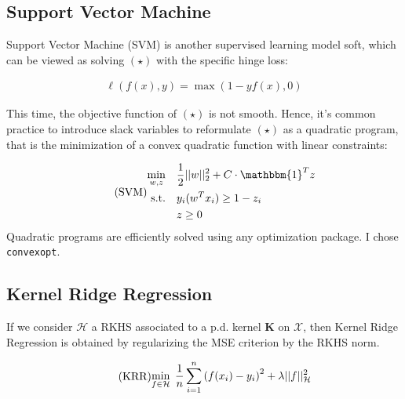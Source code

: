 \documentclass[final]{cvpr}
\begin{document}
	\subsection{Support Vector Machine} 
	
	Support Vector Machine (SVM) is another supervised learning model soft, which can be viewed as solving $(\star)$ with the specific hinge loss:
	
	\vspace{-2mm}
	
	\begin{equation*}
		\begin{aligned}
			\ell  \left( f(x), y \right) = \max \left(1-yf(x), 0 \right)
		\end{aligned}
	\end{equation*}
	
	\noindent
	This time, the objective function of $(\star)$ is not smooth. Hence, it's common practice to introduce slack variables to reformulate $(\star)$ as a quadratic program, that is the minimization of a convex quadratic function with linear constraints:
	
	\begin{equation*}\tag{\text{SVM}}
		\begin{aligned}
			\min_{w,z} \quad & \dfrac{1}{2} \vert\vert w \vert\vert_{2}^{2} + C \cdot \mathbbm{1}^T z \\
			\textrm{s.t.} \quad & y_i(w^Tx_i) \geq 1 - z_i \\
			& z \geq 0
		\end{aligned}
	\end{equation*}
	\noindent
	Quadratic programs are efficiently solved using any optimization package. I chose \texttt{convexopt}.
	
	\subsection{Kernel Ridge Regression}
	
	If we consider $\mathcal{H}$ a RKHS associated to a p.d. kernel $\mathbf{K}$ on $\mathcal{X}$, then Kernel Ridge Regression is obtained by regularizing the MSE criterion by the RKHS norm. 
	
	\begin{equation*}\tag{$\text{KRR}$}
		\begin{aligned}
			\min_{f \in \mathcal{H}}  \hspace{1mm} \dfrac{1}{n} \sum_{i=1}^{n}  \left( f(x_i) - y_i \right)^2 + \lambda \vert \vert f \vert \vert_\mathcal{H}^2
		\end{aligned}
	\end{equation*}
	
\end{document}

